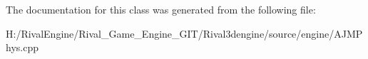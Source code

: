 The documentation for this class was generated from the following file\+:\begin{DoxyCompactItemize}
\item 
H\+:/\+Rival\+Engine/\+Rival\+\_\+\+Game\+\_\+\+Engine\+\_\+\+G\+I\+T/\+Rival3dengine/source/engine/A\+J\+M\+Phys.\+cpp\end{DoxyCompactItemize}
